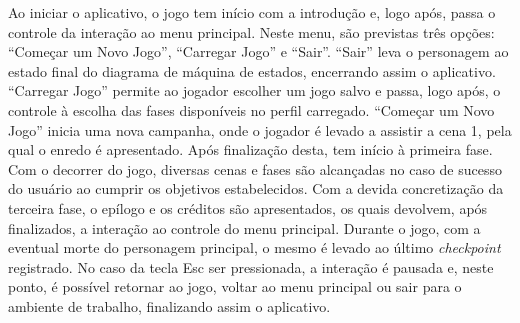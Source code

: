 Ao iniciar o aplicativo, o jogo tem início com a introdução e, logo após, passa o controle da interação ao menu principal. Neste menu, são previstas três opções: ``Começar um Novo Jogo'', ``Carregar Jogo'' e ``Sair''. ``Sair'' leva o personagem ao estado final do diagrama de máquina de estados, encerrando assim o aplicativo. ``Carregar Jogo'' permite ao jogador escolher um jogo salvo e passa, logo após, o controle à escolha das fases disponíveis no perfil carregado. ``Começar um Novo Jogo'' inicia uma nova campanha, onde o jogador é levado a assistir a cena 1, pela qual o enredo é apresentado. Após finalização desta, tem início à primeira fase. Com o decorrer do jogo,  diversas cenas e fases são alcançadas no caso de sucesso do usuário ao  cumprir os objetivos estabelecidos. Com a devida concretização da terceira fase, o epílogo e os créditos são apresentados, os quais devolvem, após finalizados, a interação ao controle do menu principal. Durante o jogo, com a eventual morte do personagem principal, o mesmo é levado ao último \textit{checkpoint} registrado. No caso da tecla Esc ser pressionada, a interação é pausada e, neste ponto, é possível retornar ao jogo, voltar ao menu principal ou sair para o ambiente de trabalho, finalizando assim o aplicativo.

